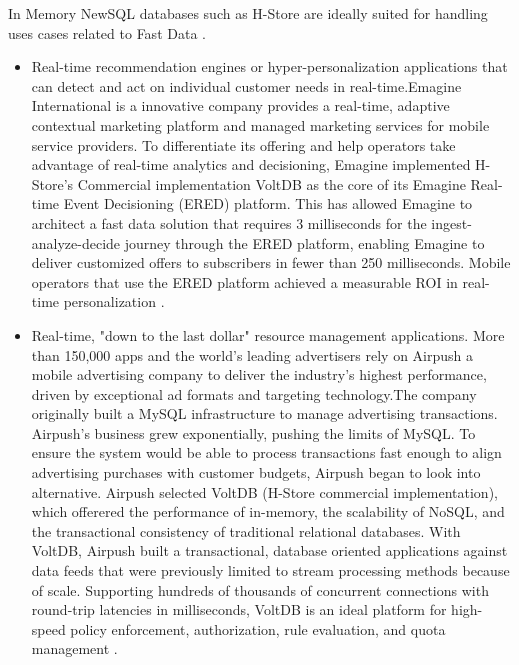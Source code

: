 \documentclass[9pt,twocolumn,twoside]{../../styles/osajnl}
\begin{document}
 In Memory NewSQL databases such as H-Store are ideally suited for handling uses cases related to Fast Data \cite{www-FastData}.
\begin{itemize}
\renewcommand{\labelitemi}{\scriptsize$\bullet$} 
\item Real-time recommendation engines or hyper-personalization applications 
that can detect and act on individual customer needs in real-time.Emagine International  is a innovative company provides a real-time, adaptive contextual marketing platform and managed marketing services for mobile service providers. 
To differentiate its offering and help operators take advantage of real-time analytics and
decisioning, Emagine implemented H-Store's Commercial implementation VoltDB as the core of its
Emagine Real-time Event Decisioning (ERED) platform. This has allowed Emagine to architect
a fast data solution that requires 3 milliseconds for the ingest-analyze-decide journey through
the ERED platform, enabling Emagine to deliver customized offers to subscribers in fewer than
250 milliseconds. Mobile operators that use the ERED platform achieved a measurable ROI
in real-time personalization \cite{www-Emagine}. 

\item Real-time, "down to the last dollar" resource management applications.
More than 150,000 apps and the world’s leading advertisers rely on Airpush a mobile advertising 
company 
to deliver the industry’s highest performance, driven by exceptional ad formats
and targeting technology.The company originally built a MySQL infrastructure
to manage advertising transactions. Airpush’s
business grew exponentially, pushing the limits of
MySQL. To ensure the system would be able to
process transactions fast enough to align advertising
purchases with customer budgets, Airpush began to
look into alternative. Airpush selected VoltDB (H-Store commercial implementation),
which offerered the performance
of in-memory, the scalability of NoSQL, and the
transactional consistency of traditional relational
databases.
With VoltDB, Airpush built a  transactional, database oriented
applications against data feeds that were
previously limited to stream processing methods
because of scale. Supporting hundreds of thousands of concurrent
connections with round-trip latencies in milliseconds,
VoltDB is an ideal platform for high-speed policy
enforcement, authorization, rule evaluation, and quota
management \cite{www-Airpush}.

\end{itemize}
\end{document}

